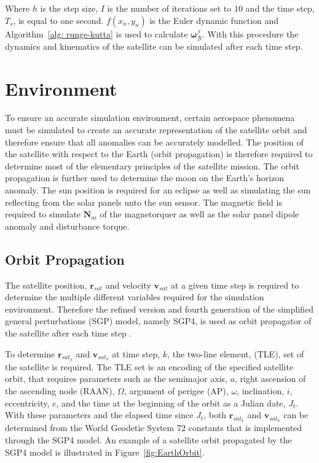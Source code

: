 Where $h$ is the step size, $I$ is the number of iterations set to $10$ and the time step, $T_s$, is equal to one second. $f(x_n, y_n)$ is the Euler dynamic function and Algorithm~\ref{alg: runge-kutta} is used to calculate $\boldsymbol{\omega}_{\mathcal{B}}^{\mathcal{I}}$.  With this procedure the dynamics and kinematics of the satellite can be simulated after each time step.

\section{Environment}
To ensure an accurate simulation environment, certain aerospace phenomena must be simulated to create an accurate representation of the satellite orbit and therefore ensure that all anomalies can be accurately modelled. The position of the satellite with respect to the Earth (orbit propagation) is therefore required to determine most of the elementary principles of the satellite mission. The orbit propagation is further used to determine the moon on the Earth's horizon anomaly. The sun position is required for an eclipse as well as simulating the sun reflecting from the solar panels unto the sun sensor. The magnetic field is required to simulate $\mathbf{N}_m$ of the magnetorquer as well as the solar panel dipole anomaly and disturbance torque. 

\subsection{Orbit Propagation}
The satellite position, $\mathbf{r}_{sat}$ and velocity $\mathbf{v}_{sat}$ at a given time step is required to determine the multiple different variables required for the simulation environment. Therefore the refined version and fourth generation of the simplified general perturbations (SGP) model, namely SGP4, is used as orbit propagator of the satellite after each time step \cite{vallado2006revisiting}. 

To determine $\mathbf{r}_{sat_k}$ and $\mathbf{v}_{sat_k}$ at time step, $k$, the two-line element, (TLE), set of the satellite is required. The TLE set is an encoding of the specified satellite orbit, that requires parameters such as the semimajor axis, $a$, right ascension of the ascending node (RAAN), $\Omega$, argument of perigee (AP), $\omega$, inclination, $i$, eccentricity, $e$, and the time at the beginning of the orbit as a Julian date, $J_t$. With these parameters and the elapsed time since $J_t$, both $\mathbf{r}_{sat_k}$ and $\mathbf{v}_{sat_k}$ can be determined from the World Geodetic System 72 constants that is implemented through the SGP4 model. An example of a satellite orbit propagated by the SGP4 model is illustrated in Figure~\ref{fig:EarthOrbit}.


